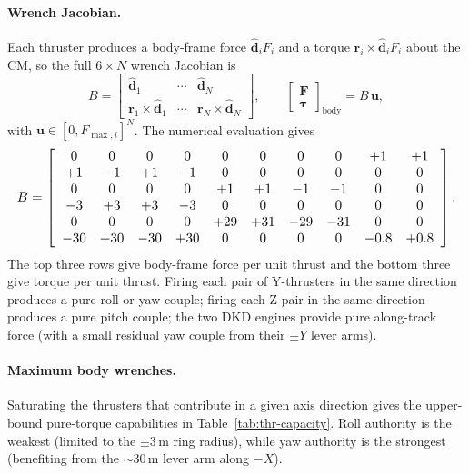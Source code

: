 \documentclass[conference]{IEEEtran}
\begin{document}
\paragraph{Wrench Jacobian.}  Each thruster produces a body-frame
force $\hat{\bm d}_i F_i$ and a torque $\bm r_i \times \hat{\bm d}_i F_i$
about the CM, so the full $6\times N$ wrench Jacobian is
\begin{equation}
  B = \begin{bmatrix} \hat{\bm d}_1 & \cdots & \hat{\bm d}_N \\
                      \bm r_1 \times \hat{\bm d}_1 & \cdots & \bm r_N \times \hat{\bm d}_N
        \end{bmatrix},
  \qquad \begin{bmatrix}\bm F \\ \bm \tau\end{bmatrix}_\text{body} = B\,\bm u,
  \label{eq:thr-B}
\end{equation}
with $\bm u \in [0, F_{\max,i}]^N$.  The numerical evaluation gives
\begin{equation}
\resizebox{\columnwidth}{!}{$\displaystyle
  B = \left[\begin{array}{cccccccccc}
    0 & 0 & 0 & 0 & 0 & 0 & 0 & 0 & +1 & +1 \\
    +1 & -1 & +1 & -1 & 0 & 0 & 0 & 0 & 0 & 0 \\
    0 & 0 & 0 & 0 & +1 & +1 & -1 & -1 & 0 & 0 \\
    -3 & +3 & +3 & -3 & 0 & 0 & 0 & 0 & 0 & 0 \\
    0 & 0 & 0 & 0 & +29 & +31 & -29 & -31 & 0 & 0 \\
    -30 & +30 & -30 & +30 & 0 & 0 & 0 & 0 & -0.8 & +0.8
  \end{array}\right].
  $}
  \label{eq:B-num}
\end{equation}
The top three rows give body-frame force per unit thrust and the bottom
three give torque per unit thrust.  Firing each pair of Y-thrusters in
the same direction produces a pure roll or yaw couple; firing each
Z-pair in the same direction produces a pure pitch couple; the two DKD
engines provide pure along-track force (with a small residual yaw
couple from their $\pm Y$ lever arms).

\paragraph{Maximum body wrenches.}  Saturating the thrusters that
contribute in a given axis direction gives the upper-bound pure-torque
capabilities in Table~\ref{tab:thr-capacity}.  Roll authority is the
weakest (limited to the $\pm 3$\,m ring radius), while yaw authority is
the strongest (benefiting from the $\sim 30$\,m lever arm along $-X$).
\end{document}
